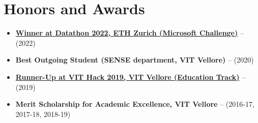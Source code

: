 \section{Honors and Awards}

\vspace{1pt}

\begin{itemize}

\item \textbf {{\href{https://github.com/FatjonZOGAJ/multilingual-text-analytics}{Winner at Datathon 2022, ETH Zurich (Microsoft Challenge)}}} -- (2022)
\item \textbf{Best Outgoing Student (SENSE department, VIT Vellore)} -- (2020)
\item \textbf {{\href{https://github.com/Siddhant-Ray/SlideEZ}{Runner-Up at VIT Hack 2019, VIT Vellore (Education Track)}}} -- (2019)
\item \textbf{Merit Scholarship for Academic Excellence, VIT Vellore } -- (2016-17, 2017-18, 2018-19)

\end{itemize}